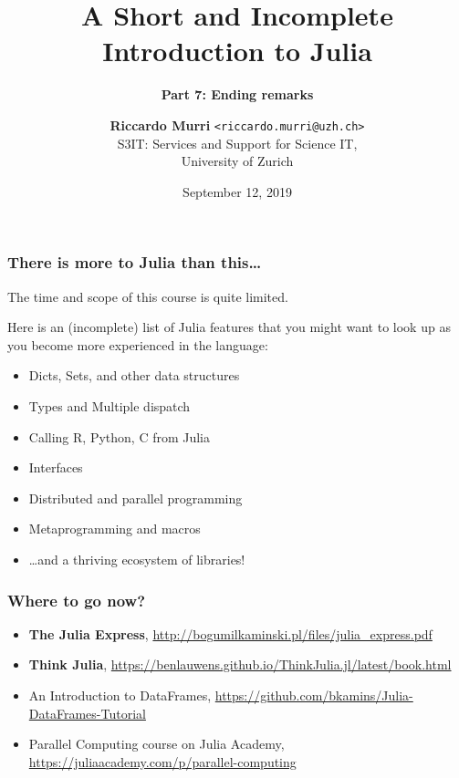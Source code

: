 \documentclass[english,serif,mathserif,xcolor=pdftex,dvipsnames,table]{beamer}
\title[Introduction to Julia]{%
  A Short and Incomplete Introduction to Julia
}
\subtitle{\bfseries Part 7: Ending remarks}
\author[R.~Murri]{%
  \textbf{Riccardo Murri} \texttt{<riccardo.murri@uzh.ch>}
  \\
  S3IT: Services and Support for Science IT,
  \\
  University of Zurich
}
\date{September 12, 2019}
\begin{document}
\maketitle


\begin{frame}
  \frametitle{There is more to Julia than this\ldots}

  The time and scope of this course is quite limited.

  \+
  Here is an (incomplete) list of Julia features that you might
  want to look up as you become more experienced in the language:
  \begin{itemize}
  \item Dicts, Sets, and other data structures
  \item Types and Multiple dispatch
  \item Calling R, Python, C from Julia
  \item Interfaces
  \item Distributed and parallel programming
  \item Metaprogramming and macros
  \item \ldots and a thriving ecosystem of libraries!
  \end{itemize}
\end{frame}




\begin{frame}[fragile]
  \frametitle{Where to go now?}

  \begin{itemize}
  \item \textbf{The Julia Express},
    {\small \url{http://bogumilkaminski.pl/files/julia_express.pdf}}
  \item \textbf{Think Julia},
    {\small\url{https://benlauwens.github.io/ThinkJulia.jl/latest/book.html}}
  \item {An Introduction to DataFrames},
    {\small\url{https://github.com/bkamins/Julia-DataFrames-Tutorial}}
  \item {Parallel Computing course on Julia Academy},
    {\small\url{https://juliaacademy.com/p/parallel-computing}}
  \end{itemize}
\end{frame}
\end{document}
